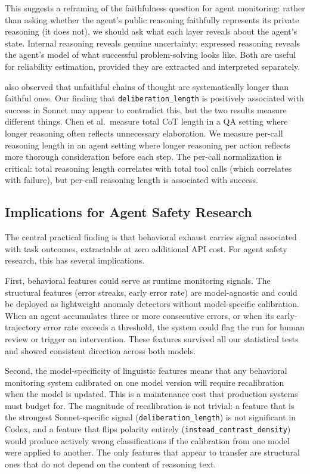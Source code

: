 \documentclass[11pt]{article}
\newcommand{\feat}[1]{\texttt{#1}}
\begin{document}
This suggests a reframing of the faithfulness question for agent monitoring: rather than asking whether the agent's public reasoning faithfully represents its private reasoning (it does not), we should ask what each layer reveals about the agent's state.
Internal reasoning reveals genuine uncertainty; expressed reasoning reveals the agent's model of what successful problem-solving looks like.
Both are useful for reliability estimation, provided they are extracted and interpreted separately.

\citet{chen2025unfaithful} also observed that unfaithful chains of thought are systematically longer than faithful ones.
Our finding that \feat{deliberation\_length} is positively associated with success in Sonnet may appear to contradict this, but the two results measure different things.
Chen et al.\ measure total CoT length in a QA setting where longer reasoning often reflects unnecessary elaboration.
We measure per-call reasoning length in an agent setting where longer reasoning per action reflects more thorough consideration before each step.
The per-call normalization is critical: total reasoning length correlates with total tool calls (which correlates with failure), but per-call reasoning length is associated with success.

\subsection{Implications for Agent Safety Research}

The central practical finding is that behavioral exhaust carries signal associated with task outcomes, extractable at zero additional API cost.
For agent safety research, this has several implications.

First, behavioral features could serve as runtime monitoring signals.
The structural features (error streaks, early error rate) are model-agnostic and could be deployed as lightweight anomaly detectors without model-specific calibration.
When an agent accumulates three or more consecutive errors, or when its early-trajectory error rate exceeds a threshold, the system could flag the run for human review or trigger an intervention.
These features survived all our statistical tests and showed consistent direction across both models.

Second, the model-specificity of linguistic features means that any behavioral monitoring system calibrated on one model version will require recalibration when the model is updated.
This is a maintenance cost that production systems must budget for.
The magnitude of recalibration is not trivial: a feature that is the strongest Sonnet-specific signal (\feat{deliberation\_length}) is not significant in Codex, and a feature that flips polarity entirely (\feat{instead\_contrast\_density}) would produce actively wrong classifications if the calibration from one model were applied to another.
The only features that appear to transfer are structural ones that do not depend on the content of reasoning text.
\end{document}
